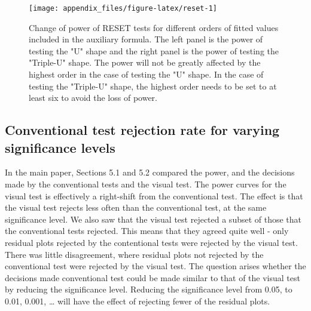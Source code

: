 \documentclass[]{interact}
\theoremstyle{plain}%
\theoremstyle{definition}
\theoremstyle{remark}
\begin{document}
\begin{figure}

{\centering \texttt{[image: appendix\_files/figure-latex/reset-1]} 

}

\caption{Change of power of RESET tests for different orders of fitted values included in the auxiliary formula. The left panel is the power of testing the "U" shape and the right panel is the power of testing the "Triple-U" shape. The power will not be greatly affected by the highest order in the case of testing the "U" shape. In the case of testing the "Triple-U" shape, the highest order needs to be set to at least six to avoid the loss of power.}\label{fig:reset}
\end{figure}

\hypertarget{conventional-test-rejection-rate-for-varying-significance-levels}{%
\subsection{Conventional test rejection rate for varying significance
levels}\label{conventional-test-rejection-rate-for-varying-significance-levels}}

In the main paper, Sections 5.1 and 5.2 compared the power, and the
decisions made by the conventional tests and the visual test. The power
curves for the visual test is effectively a right-shift from the
conventional test. The effect is that the visual test rejects less often
than the conventional test, at the same significance level. We also saw
that the visual test rejected a subset of those that the conventional
tests rejected. This means that they agreed quite well - only residual
plots rejected by the contentional tests were rejected by the visual
test. There was little disagreement, where residual plots not rejected
by the conventional test were rejected by the visual test. The question
arises whether the decisions made conventional test could be made
similar to that of the visual test by reducing the significance level.
Reducing the significance level from 0.05, to 0.01, 0.001, \ldots{} will
have the effect of rejecting fewer of the residual plots.
\end{document}
